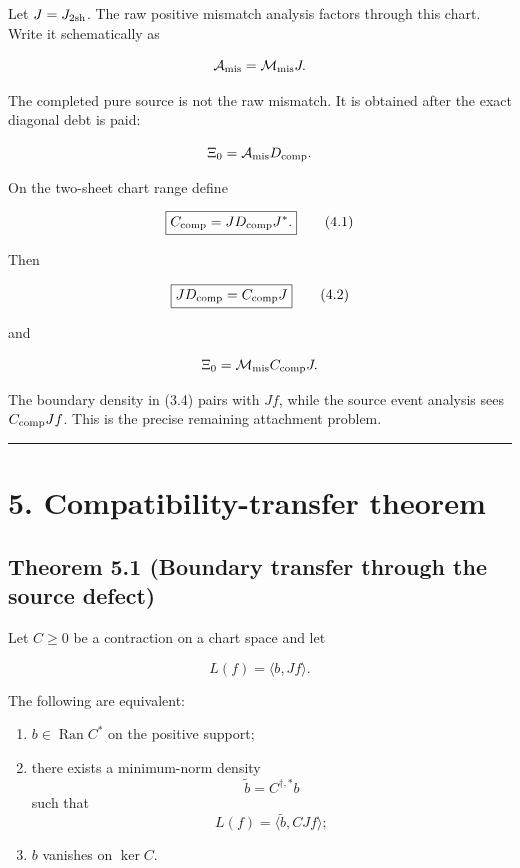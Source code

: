 Let \(J=J_{\rm 2sh}\). The raw positive mismatch analysis factors through this
chart. Write it schematically as

\[
\mathcal A_{\rm mis}=\mathcal M_{\rm mis}J.
\]

The completed pure source is not the raw mismatch. It is obtained after the
exact diagonal debt is paid:

\[
\Xi_0
=\mathcal A_{\rm mis}D_{\rm comp}.
\]

On the two-sheet chart range define

\[
\boxed{
C_{\rm comp}=JD_{\rm comp}J^*.
}
\tag{4.1}
\]

Then

\[
\boxed{
JD_{\rm comp}=C_{\rm comp}J
}
\tag{4.2}
\]

and

\[
\Xi_0
=\mathcal M_{\rm mis}C_{\rm comp}J.
\]

The boundary density in (3.4) pairs with \(Jf\), while the source event analysis
sees \(C_{\rm comp}Jf\). This is the precise remaining attachment problem.

\begin{center}\rule{0.5\linewidth}{0.5pt}\end{center}

\hypertarget{compatibility-transfer-theorem}{%
\section{5. Compatibility-transfer theorem}\label{compatibility-transfer-theorem}}

\hypertarget{theorem-5.1-boundary-transfer-through-the-source-defect}{%
\subsection{Theorem 5.1 (Boundary transfer through the source defect)}\label{theorem-5.1-boundary-transfer-through-the-source-defect}}

Let \(C\ge0\) be a contraction on a chart space and let

\[
L(f)=\langle b,Jf\rangle.
\]

The following are equivalent:

\begin{enumerate}
\def\labelenumi{\arabic{enumi}.}
\tightlist
\item
  \(b\in\operatorname{Ran}C^*\) on the positive support;
\item
  there exists a minimum-norm density
  \[
  \widetilde b=C^{\dagger,*}b
  \]
  such that
  \[
  L(f)=\langle\widetilde b,CJf\rangle;
  \]
\item
  \(b\) vanishes on \(\ker C\).
\end{enumerate}

